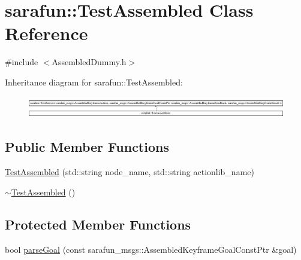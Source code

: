 \hypertarget{classsarafun_1_1TestAssembled}{\section{sarafun\-:\-:Test\-Assembled Class Reference}
\label{classsarafun_1_1TestAssembled}
}


{\ttfamily \#include $<$Assembled\-Dummy.\-h$>$}

Inheritance diagram for sarafun\-:\-:Test\-Assembled\-:\begin{figure}[H]
\begin{center}
\leavevmode
\includegraphics[height=0.950764cm]{classsarafun_1_1TestAssembled}
\end{center}
\end{figure}
\subsection*{Public Member Functions}
\begin{DoxyCompactItemize}
\item 
\hyperlink{classsarafun_1_1TestAssembled_a8dc24147e3bf80fc15270d83b1f49c89}{Test\-Assembled} (std\-::string node\-\_\-name, std\-::string actionlib\-\_\-name)
\item 
\hyperlink{classsarafun_1_1TestAssembled_a5f9109b205eea68a6f54773657198880}{$\sim$\-Test\-Assembled} ()
\end{DoxyCompactItemize}
\subsection*{Protected Member Functions}
\begin{DoxyCompactItemize}
\item 
bool \hyperlink{classsarafun_1_1TestAssembled_a789f7d148a50abb23c9a4c0b5aeabdff}{parse\-Goal} (const sarafun\-\_\-msgs\-::\-Assembled\-Keyframe\-Goal\-Const\-Ptr \&goal)
\end{DoxyCompactItemize}


